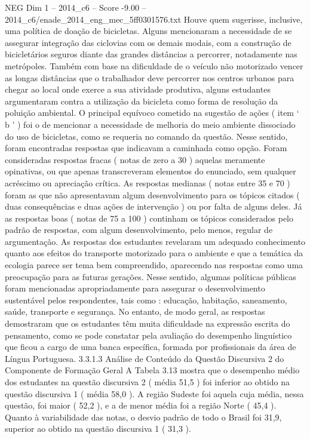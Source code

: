 \begin{textsample}{NEG Dim 1 – 2014\_c6 – Score -9.00 – 2014\_c6/enade\_2014\_eng\_mec\_5ff0301576.txt}
Houve quem sugerisse, inclusive, uma política de doação de bicicletas.
Alguns mencionaram a necessidade de se assegurar integração das ciclovias com os demais modais, com a construção de bicicletários seguros diante das grandes distâncias a percorrer, notadamente nas metrópoles.
Também com base na dificuldade de o veículo não motorizado vencer as longas distâncias que o trabalhador deve percorrer nos centros urbanos para chegar ao local onde exerce a sua atividade produtiva, alguns estudantes argumentaram contra a utilização da bicicleta como forma de resolução da poluição ambiental.
O principal equívoco cometido na sugestão de ações ( item ‘ b ’ ) foi o de mencionar a necessidade de melhoria do meio ambiente dissociado do uso de bicicletas, como se requeria no comando da questão.
Nesse sentido, foram encontradas respostas que indicavam a caminhada como opção.
Foram consideradas respostas fracas ( notas de zero a 30 ) aquelas meramente opinativas, ou que apenas transcreveram elementos do enunciado, sem qualquer acréscimo ou apreciação crítica.
As respostas medianas ( notas entre 35 e 70 ) foram as que não apresentavam algum desenvolvimento para os tópicos citados ( duas consequências e duas ações de intervenção ) ou por falta de alguns deles.
Já as respostas boas ( notas de 75 a 100 ) continham os tópicos considerados pelo padrão de respostas, com algum desenvolvimento, pelo menos, regular de argumentação.
As respostas dos estudantes revelaram um adequado conhecimento quanto aos efeitos do transporte motorizado para o ambiente e que a temática da ecologia parece ser tema bem compreendido, aparecendo nas respostas como uma preocupação para as futuras gerações.
Nesse sentido, algumas políticas públicas foram mencionadas apropriadamente para assegurar o desenvolvimento sustentável pelos respondentes, tais como : educação, habitação, saneamento, saúde, transporte e segurança.
No entanto, de modo geral, as respostas demostraram que os estudantes têm muita dificuldade na expressão escrita do pensamento, como se pode constatar pela avaliação do desempenho linguístico que ficou a cargo de uma banca específica, formada por profissionais da área de Língua Portuguesa. 3.3.1.3 Análise de Conteúdo da Questão Discursiva 2 do Componente de Formação Geral A Tabela 3.13 mostra que o desempenho médio dos estudantes na questão discursiva 2 ( média 51,5 ) foi inferior ao obtido na questão discursiva 1 ( média 58,0 ).
A região Sudeste foi aquela cuja média, nessa questão, foi maior ( 52,2 ), e a de menor média foi a região Norte ( 45,4 ).
Quanto à variabilidade das notas, o desvio padrão de todo o Brasil foi 31,9, superior ao obtido na questão discursiva 1 ( 31,3 ).

\end{textsample}
